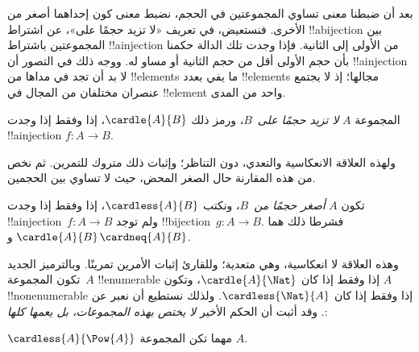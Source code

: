 \documentclass[../../../include/open-logic-section]{subfiles}
\begin{document}


\begin{explain}
بعد أن ضبطنا معنى تساوي المجموعتين في الحجم، نضبط معنى كون إحداهما أصغر من الأخرى. فنستعيض، في تعريف «لا تزيد حجمًا على»، عن اشتراط !!a{bijection} بين المجموعتين باشتراط !!a{injection} من الأولى إلى الثانية. فإذا وجدت تلك الدالة حكمنا بأن حجم الأولى أقل من حجم الثانية أو مساو له. ووجه ذلك في التصور أن !!a{injection} لا بد أن تجد في مداها من !!{element}s ما يفي بعدد !!{element}s مجالها؛ إذ لا يجتمع عنصران مختلفان من المجال في !!{element} واحد من المدى.
\end{explain}

\begin{defn}
المجموعة $A$ \emph{لا تزيد حجمًا على}~$B$، ورمز ذلك $\cardle{A}{B}$، إذا وفقط إذا وجدت !!a{injection} $f \colon A \to B$.
\end{defn}

ولهذه العلاقة الانعكاسية والتعدي، دون التناظر؛ وإثبات ذلك متروك للتمرين. ثم نخص من هذه المقارنة حال الصغر المحض، حيث لا تساوي بين الحجمين.

\begin{defn}
تكون $A$ \emph{أصغر حجمًا من}~$B$، ونكتب $\cardless{A}{B}$، إذا وفقط إذا وجدت !!a{injection}~$f\colon A \to B$ ولم توجد !!{bijection}~$g\colon A
\to B$. فشرطا ذلك هما $\cardle{A}{B}$ و$\cardneq{A}{B}$.
\end{defn}

وهذه العلاقة لا انعكاسية، وهي متعدية؛ وللقارئ إثبات الأمرين تمرينًا. وبالترميز الجديد تكون المجموعة~$A$ !!{enumerable} إذا وفقط إذا كان $\cardle{A}{\Nat}$، وتكون $A$ !!{nonenumerable} إذا وفقط إذا كان $\cardless{\Nat}{A}$. ولذلك نستطيع أن نعبر عن
. وقد أثبت \citet{Cantor1892} أن الحكم الأخير \emph{لا يختص بهذه المجموعات، بل يعمها كلها}:

\begin{thm}[كانتور]
$\cardless{A}{\Pow{A}}$ مهما تكن المجموعة $A$.
\end{thm}
\end{document}
